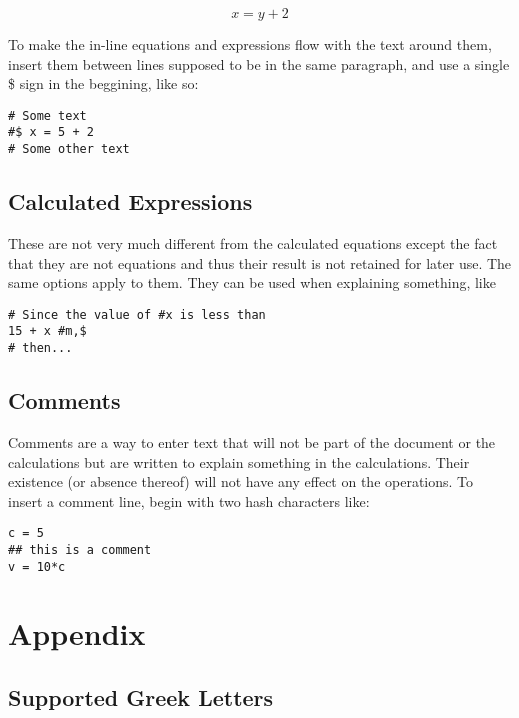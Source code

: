 \documentclass[12pt]{article}
\begin{document}
\[
    x = y + 2
\]

To make the in-line equations and expressions flow with the text around them,
insert them between lines supposed to be in the same paragraph, and use a
single \$ sign in the beggining, like so:

\begin{verbatim}
# Some text
#$ x = 5 + 2
# Some other text
\end{verbatim}

\subsection{Calculated Expressions}
\label{expressions}

These are not very much different from the calculated equations except the fact
that they are not equations and thus their result is not retained for later
use. The same options apply to them.  They can be used when explaining
something, like

\begin{verbatim}
# Since the value of #x is less than
15 + x #m,$
# then...
\end{verbatim}

\subsection{Comments}

Comments are a way to enter text that will not be part of the document or the
calculations but are written to explain something in the calculations. Their
existence (or absence thereof) will not have any effect on the operations. To
insert a comment line, begin with two hash characters like:

\begin{verbatim}
c = 5
## this is a comment
v = 10*c
\end{verbatim}

\section{Appendix}

\subsection{Supported Greek Letters}
\label{greek}
\end{document}
